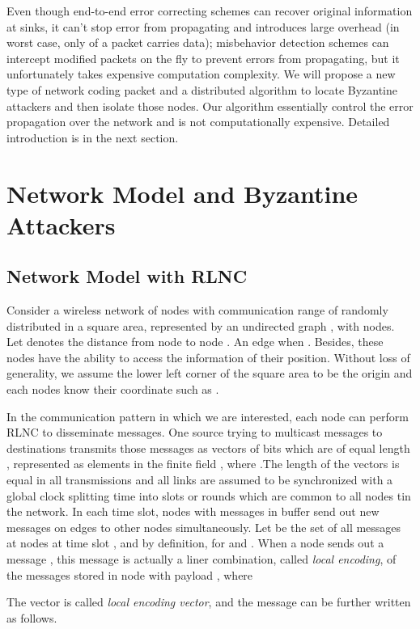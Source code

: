 \documentclass[conference]{IEEEtran}
\begin{document}
Even though end-to-end error correcting schemes can recover original information at sinks, it can't stop error from propagating and introduces large overhead (in worst case, only  of a packet carries data); misbehavior detection schemes can intercept modified packets on the fly to prevent errors from propagating, but it unfortunately takes expensive computation complexity. We will propose a new type of network coding packet and a distributed algorithm to locate Byzantine attackers and then isolate those nodes. Our algorithm essentially control the error propagation over the network and is not computationally expensive. Detailed introduction is in the next section.

\section{Network Model and Byzantine Attackers}
\subsection{Network Model with RLNC}
Consider a wireless network of  nodes with communication range of  randomly distributed in a square area, represented by an undirected graph , with  nodes. Let  denotes the distance from node  to node . An edge  when . Besides, these  nodes have the ability to access the information of their position. Without loss of generality, we assume the lower left corner of the square area to be the origin and each nodes know their coordinate such as .

In the communication pattern in which we are interested, each node can perform RLNC to disseminate messages. One source  trying to multicast  messages  to  destinations  transmits those messages as vectors of bits which are of equal length , represented as elements in the finite field , where .The length of the vectors is equal in all transmissions and all links are assumed to be synchronized with a global clock splitting time into slots or rounds which are common to all nodes tin the network. In each time slot, nodes with messages in buffer send out new messages on edges to other nodes simultaneously. Let  be the set of all messages at nodes  at time slot , and by definition, for  and . When a node  sends out a message , this message is actually a liner combination, called \emph{local encoding}, of the messages stored in node  with payload , where

The vector {\boldmath}  is called \emph{local encoding vector}, and the message  can be further written as follows.
\end{document}
